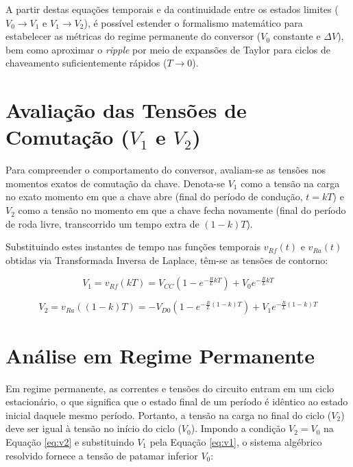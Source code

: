 A partir destas equações temporais e da continuidade entre os estados limites ($V_0 \to V_1$ e $V_1 \to V_2$), é possível estender o formalismo matemático para estabelecer as métricas do regime permanente do conversor ($V_0$ constante e $\Delta V$), bem como aproximar o \textit{ripple} por meio de expansões de Taylor para ciclos de chaveamento suficientemente rápidos ($T \to 0$).



\section{Avaliação das Tensões de Comutação ($V_1$ e $V_2$)}

Para compreender o comportamento do conversor, avaliam-se as tensões nos momentos exatos de comutação da chave. Denota-se $V_1$ como a tensão na carga no exato momento em que a chave abre (final do período de condução, $t = kT$) e $V_2$ como a tensão no momento em que a chave fecha novamente (final do período de roda livre, transcorrido um tempo extra de $(1-k)T$).

Substituindo estes instantes de tempo nas funções temporais $v_{Rf}(t)$ e $v_{Ra}(t)$ obtidas via Transformada Inversa de Laplace, têm-se as tensões de contorno:

\begin{equation}
	V_1 = v_{Rf}(kT) = V_{CC} \left(1 - e^{-\frac{R}{L}kT}\right) + V_0 e^{-\frac{R}{L}kT}
	\label{eq:v1}
\end{equation}

\begin{equation}
	V_2 = v_{Ra}((1-k)T) = -V_{D0} \left(1 - e^{-\frac{R}{L}(1-k)T}\right) + V_1 e^{-\frac{R}{L}(1-k)T}
	\label{eq:v2}
\end{equation}

\section{Análise em Regime Permanente}

Em regime permanente, as correntes e tensões do circuito entram em um ciclo estacionário, o que significa que o estado final de um período é idêntico ao estado inicial daquele mesmo período. Portanto, a tensão na carga no final do ciclo ($V_2$) deve ser igual à tensão no início do ciclo ($V_0$). Impondo a condição $V_2 = V_0$ na Equação \ref{eq:v2} e substituindo $V_1$ pela Equação \ref{eq:v1}, o sistema algébrico resolvido fornece a tensão de patamar inferior $V_0$:

